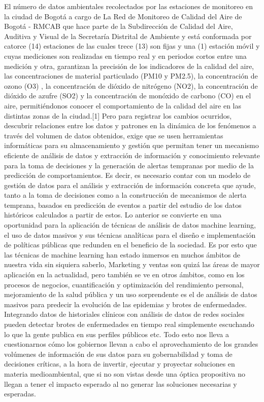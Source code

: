 El número de datos ambientales recolectados por las estaciones de monitoreo en la ciudad de Bogotá a cargo de La Red de Monitoreo de Calidad del Aire de Bogotá - RMCAB que hace parte de la Subdirección de Calidad del Aire, Auditiva y Visual de la Secretaría Distrital de Ambiente y está conformada por catorce (14) estaciones de las cuales trece (13) son fijas y una (1) estación móvil y cuyas mediciones son realizadas en tiempo real y en periodos  cortos entre una medición y otra, garantizan la precisión de los indicadores de la calidad del aire, las concentraciones de material particulado (PM10 y PM2.5), la concentración de ozono (O3) , la concentración de dióxido de nitrógeno (NO2), la concentración de dióxido de azufre (SO2) y la concentración de monóxido de carbono (CO) en el aire, permitiéndonos conocer el comportamiento de la calidad del aire en las distintas zonas de la ciudad.[1]
Pero para registrar los cambios ocurridos, descubrir relaciones entre los datos y patrones en la dinámica de los fenómenos a través del volumen de datos obtenidos, exige que se usen herramientas informáticas para su almacenamiento y gestión que permitan tener un mecanismo eficiente de análisis de datos y extracción de información y conocimiento relevante para la toma de decisiones y la generación de alertas tempranas por medio de la predicción de comportamientos.
Es decir, es necesario contar con un modelo de gestión de datos para el análisis y extracción de información concreta que ayude, tanto a la toma de decisiones como a la construcción de mecanismos de alerta temprana, basados en predicción de eventos a partir del estudio de los datos históricos calculados a partir de estos.
Lo anterior se convierte en una oportunidad para la aplicación de técnicas de análisis de datos machine learning, el uso de datos masivos y sus técnicas analíticas para el diseño e implementación de políticas públicas que redunden en el beneficio de la sociedad.
Es por esto que las técnicas de machine learning han estado inmersos en muchos ámbitos de nuestra vida sin siquiera saberlo, Marketing y ventas son quizá las áreas de mayor aplicación en la actualidad, pero también se ve en otros ámbitos, como en los procesos de negocios, cuantificación y optimización del rendimiento personal, mejoramiento de la salud pública y un uso sorprendente es el de análisis de datos masivos para predecir la evolución de las epidemias y brotes de enfermedades. Integrando datos de historiales clínicos con análisis de datos de redes sociales pueden detectar brotes de enfermedades en tiempo real simplemente escuchando lo que la gente publica en sus perfiles públicos etc.
Todo esto nos lleva a cuestionarnos cómo los gobiernos llevan a cabo el aprovechamiento de los grandes volúmenes de información de sus datos para su gobernabilidad y toma de decisiones críticas, a la hora de invertir, ejecutar y proyectar soluciones en materia medioambiental, que si no son vistas desde una óptica propositiva no llegan a tener el impacto esperado al no generar las soluciones necesarias y esperadas.


